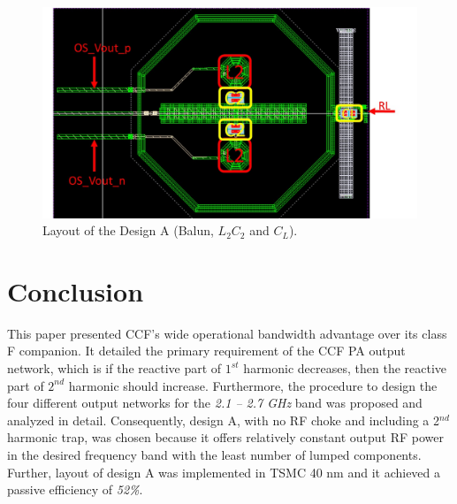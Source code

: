 \documentclass[conference]{IEEEtran}
\begin{document}
\begin{figure}[!t]
\centering
\captionsetup{font=footnotesize}
\includegraphics[width=0.93\linewidth]{Images/Output_Network_Comp/ON_X1.jpg}
\caption{Layout of the Design A (Balun, $L_2C_2$ and $C_L$).}
\label{fig:ON_X1}
\vspace{-0.25in}
\end{figure}

\section{Conclusion}
\label{section:Conclusion}
This paper presented CCF's wide operational bandwidth advantage over its class F companion. It detailed the primary requirement of the CCF PA output network, which is if the reactive part of $1^{st}$ harmonic decreases, then the reactive part of $2^{nd}$ harmonic should increase. Furthermore, the procedure to design the four different output networks for the \textit{2.1 -- 2.7 GHz} band was proposed and analyzed in detail.  Consequently, design A, with no RF choke and  including a 2$^{nd}$ harmonic trap, was chosen because it offers relatively constant output RF power in the desired frequency band with the least number of lumped components. Further, layout of design A was implemented in TSMC 40 nm and it achieved a passive efficiency of \textit{52\%}.



\end{document}
